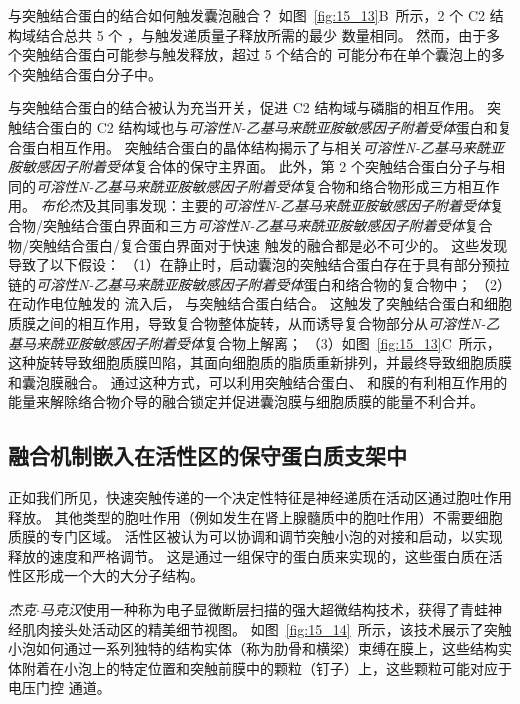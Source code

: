  与突触结合蛋白的结合如何触发囊泡融合？
如图~\ref{fig:15_13}B~所示，2 个 C2 结构域结合总共 5 个 ，与触发递质量子释放所需的最少  数量相同。
然而，由于多个突触结合蛋白可能参与触发释放，超过 5 个结合的  可能分布在单个囊泡上的多个突触结合蛋白分子中。


 与突触结合蛋白的结合被认为充当开关，促进 C2 结构域与磷脂的相互作用。
突触结合蛋白的 C2 结构域也与\textit{可溶性N-乙基马来酰亚胺敏感因子附着受体}蛋白和复合蛋白相互作用。
突触结合蛋白的晶体结构揭示了与相关\textit{可溶性N-乙基马来酰亚胺敏感因子附着受体}复合体的保守主界面。
此外，第 2 个突触结合蛋白分子与相同的\textit{可溶性N-乙基马来酰亚胺敏感因子附着受体}复合物和络合物形成三方相互作用。
\textit{布伦杰}及其同事发现：主要的\textit{可溶性N-乙基马来酰亚胺敏感因子附着受体}复合物/突触结合蛋白界面和三方\textit{可溶性N-乙基马来酰亚胺敏感因子附着受体}复合物/突触结合蛋白/复合蛋白界面对于快速  触发的融合都是必不可少的。
这些发现导致了以下假设：
（1）在静止时，启动囊泡的突触结合蛋白存在于具有部分预拉链的\textit{可溶性N-乙基马来酰亚胺敏感因子附着受体}蛋白和络合物的复合物中；
（2）在动作电位触发的  流入后， 与突触结合蛋白结合。
这触发了突触结合蛋白和细胞质膜之间的相互作用，导致复合物整体旋转，从而诱导复合物部分从\textit{可溶性N-乙基马来酰亚胺敏感因子附着受体}复合物上解离；
（3）如图~\ref{fig:15_13}C~所示，这种旋转导致细胞质膜凹陷，其面向细胞质的脂质重新排列，并最终导致细胞质膜和囊泡膜融合。
通过这种方式，可以利用突触结合蛋白、 和膜的有利相互作用的能量来解除络合物介导的融合锁定并促进囊泡膜与细胞质膜的能量不利合并。



\subsection{融合机制嵌入在活性区的保守蛋白质支架中}

正如我们所见，快速突触传递的一个决定性特征是神经递质在活动区通过胞吐作用释放。
其他类型的胞吐作用（例如发生在肾上腺髓质中的胞吐作用）不需要细胞质膜的专门区域。
活性区被认为可以协调和调节突触小泡的对接和启动，以实现释放的速度和严格调节。
这是通过一组保守的蛋白质来实现的，这些蛋白质在活性区形成一个大的大分子结构。


\textit{杰克$\cdot$马克汉}使用一种称为电子显微断层扫描的强大超微结构技术，获得了青蛙神经肌肉接头处活动区的精美细节视图。
如图~\ref{fig:15_14}~所示，该技术展示了突触小泡如何通过一系列独特的结构实体（称为肋骨和横梁）束缚在膜上，这些结构实体附着在小泡上的特定位置和突触前膜中的颗粒（钉子）上，这些颗粒可能对应于电压门控  通道。


